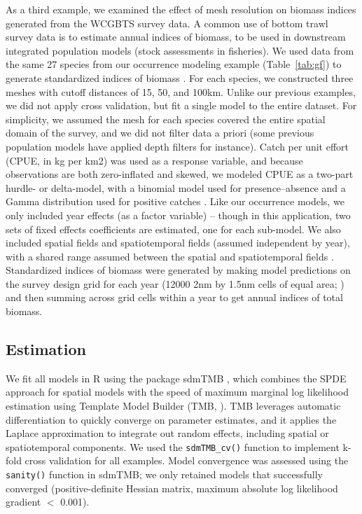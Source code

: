 \documentclass[11pt]{article}
\begin{document}
As a third example, we examined the effect of mesh resolution on biomass
indices generated from the WCGBTS survey data. A common use of bottom trawl
survey data is to estimate annual indices of biomass, to be used in downstream
integrated population models (stock assessments in fisheries). We used data
from the same 27 species from our occurrence modeling example
(Table~\ref{tab:gf}) to generate standardized indices of biomass
\citep{thorson2015,thorson2013}. For each species, we constructed three meshes
with cutoff distances of 15, 50, and 100km. Unlike our previous examples, we
did not apply cross validation, but fit a single model to the entire dataset.
For simplicity, we assumed the mesh for each species covered the entire spatial
domain of the survey, and we did not filter data a priori (some previous
population models have applied depth filters for instance). Catch per unit
effort (CPUE, in kg per km2) was used as a response variable, and because
observations are both zero-inflated and skewed, we modeled CPUE as a two-part
hurdle- or delta-model, with a binomial model used for presence--absence and a
Gamma distribution used for positive catches \citep{pennington1983}. Like our
occurrence models, we only included year effects (as a factor variable) --
though in this application, two sets of fixed effects coefficients are
estimated, one for each sub-model. We also included spatial fields and
spatiotemporal fields (assumed independent by year), with a shared range
assumed between the spatial and spatiotemporal fields \citep{anderson2022}.
Standardized indices of biomass were generated by making model predictions on
the survey design grid for each year (12000 2nm by
1.5nm cells of equal area; \citep{keller_northwest_2017}) and then summing
  across grid cells within a year to get annual indices of total biomass.

\subsection{Estimation}

We fit all models in R \citep{r2024} using the package sdmTMB
\citep{anderson2022}, which combines the SPDE approach for spatial models with
the speed of maximum marginal log likelihood estimation using Template Model
Builder (TMB, \citep{kristensen_tmb_2016}). TMB leverages automatic
differentiation to quickly converge on parameter estimates, and it applies the
Laplace approximation to integrate out random effects, including spatial or
spatiotemporal components. We used the \texttt{sdmTMB\_cv()} function to
implement k-fold cross validation for all examples. Model convergence was
assessed using the \texttt{sanity()} function in sdmTMB; we only retained
models that successfully converged (positive-definite Hessian matrix, maximum
absolute log likelihood gradient $<$ 0.001).
\end{document}
